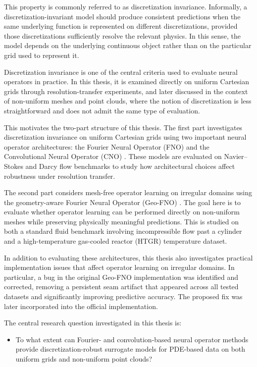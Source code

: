This property is commonly referred to as discretization invariance. Informally, a discretization\hyp{}invariant model should produce consistent predictions when the same underlying function is represented on different discretizations, provided those discretizations sufficiently resolve the relevant physics. In this sense, the model depends on the underlying continuous object rather than on the particular grid used to represent it.

Discretization invariance is one of the central criteria used to evaluate neural operators in practice. In this thesis, it is examined directly on uniform Cartesian grids through resolution-transfer experiments, and later discussed in the context of non-uniform meshes and point clouds, where the notion of discretization is less straightforward and does not admit the same type of evaluation.

This motivates the two-part structure of this thesis. The first part investigates discretization invariance on uniform Cartesian grids using two important neural operator architectures: the Fourier Neural Operator (FNO) \cite{li2021fno} and the Convolutional Neural Operator (CNO) \cite{cno}. These models are evaluated on Navier--Stokes and Darcy flow benchmarks to study how architectural choices affect robustness under resolution transfer.

The second part considers mesh-free operator learning on irregular domains using the geometry-aware Fourier Neural Operator (Geo-FNO) \cite{geo-fno}. The goal here is to evaluate whether operator learning can be performed directly on non-uniform meshes while preserving physically meaningful predictions. This is studied on both a standard fluid benchmark involving incompressible flow past a cylinder and a high-temperature gas-cooled reactor (HTGR) temperature dataset.

In addition to evaluating these architectures, this thesis also investigates practical implementation issues that affect operator learning on irregular domains. In particular, a bug in the original Geo-FNO \cite{geo-fno-repo} implementation was identified and corrected, removing a persistent seam artifact that appeared across all tested datasets and significantly improving predictive accuracy. The proposed fix was later incorporated into the official implementation.

The central research question investigated in this thesis is:

\begin{itemize}
    \item To what extent can Fourier- and convolution-based neural operator methods provide discretization-robust surrogate models for PDE-based data on both uniform grids and non-uniform point clouds?
\end{itemize}

